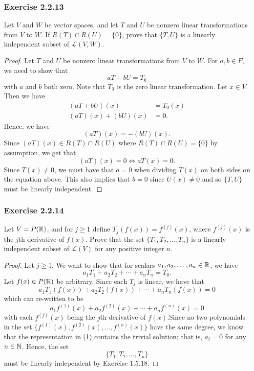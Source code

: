 \subsubsection{Exercise 2.2.13} Let \( V  \) and \( W  \) be vector spaces, and let \( T  \) and \( U  \) be nonzero linear transformations from \( V  \) to \( W  \). If \( R(T) \cap R(U) = \{ 0  \}   \), prove that \( \{ T, U  \}   \) is a linearly independent subset of \( \mathcal{L}(V, W ) \).
\begin{proof}
Let \( T \) and \( U  \) be nonzero linear transformations from \( V  \) to \( W  \). For \( a,b \in F  \), we need to show that 
\[  aT + bU = {T}_{0} \] with \( a  \) and \( b  \) both zero. Note that \( {T}_{0} \) is the zero linear transformation. Let \( x \in V  \). Then we have
\begin{align*}
    (aT + bU)(x) &= {T}_{0}(x)  \\
    (aT)(x) + (bU)(x) &= 0. 
\end{align*}
Hence, we have
\[  (aT)(x) = -(bU)(x).  \]
Since \( (aT)(x) \in R(T) \cap R(U) \) where \( R(T) \cap R(U) = \{ 0  \}   \) by assumption, we get that
\[  (aT)(x) = 0 \iff aT(x) = 0. \]
Since \( T(x) \neq 0  \), we must have that \( a = 0  \) when dividing \( T(x)  \) on both sides on the equation above. This also implies that \( b = 0  \) since \( U(x) \neq 0  \) and so \( \{ T, U  \}  \) must be linearly independent.
\end{proof}

\subsubsection{Exercise 2.2.14} Let \( V = P(\mathbb{R}) \), and for \( j \geq 1   \) define \( {T}_{j}(f(x)) = f^{(j)}(x)  \), where \( f^{(j)}(x) \) is the \( j \)th derivative of \( f(x) \). Prove that the set \( \{ {T}_{1}, {T}_{2}, \dots, {T}_{n} \}  \) is a linearly independent subset of \( \mathcal{L}(V) \) for any positive integer \( n \).
\begin{proof}
Let \( j \geq 1  \). We want to show that for scalars \( {a}_{1}, {a}_{2}, \dots, {a}_{n} \in \mathbb{R}  \), we have
\[  {a}_{1} {T}_{1} + {a}_{2} {T}_{2} + \cdots + {a}_{n} {T}_{n} = {T}_{0}. \]
Let \( f(x) \in P(\mathbb{R}) \) be arbitrary. Since each \( {T}_{j} \) is linear, we have that
\[  {a}_{1} {T}_{1}(f(x)) + {a}_{2} {T}_{2}(f(x)) + \cdots + {a}_{n} {T}_{n}(f(x)) = 0 \]
which can re-written to be
\[  {a}_{1} f^{(1)}(x) + {a}_{2} f^{(2)}(x) + \cdots + {a}_{n} f^{(n)}(x) = 0 \tag{1} \]
with each \( f^{(j)}(x) \) being the \( j \)th derivative of \( f(x) \).Since no two polynomials in the set \( \{ f^{(1)}(x), f^{(2)}(x), \dots, f^{(n)}(x) \}  \) have the same degree, we know that the representation in (1) contains the trivial solution; that is, \( {a}_{i} = 0  \) for any \( n \in \mathbb{N}   \). Hence, the set \[  \{ {T}_{1}, {T}_{2}, \dots, {T}_{n} \}  \] must be linearly independent by Exercise 1.5.18.
\end{proof}

